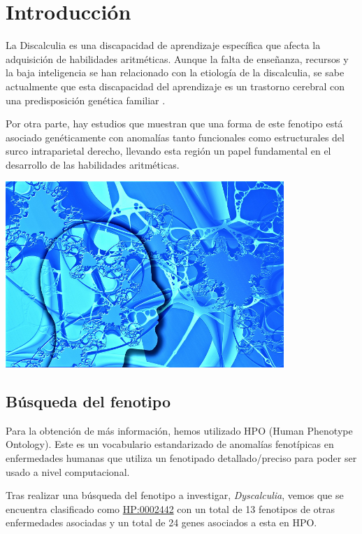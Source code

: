 \section{Introducción}

La Discalculia es una discapacidad de aprendizaje específica que afecta la adquisición de habilidades aritméticas. Aunque la falta de  enseñanza, recursos y la baja inteligencia se han relacionado con la etiología de la discalculia, se sabe actualmente que esta discapacidad del aprendizaje es un trastorno cerebral con una predisposición genética familiar \cite{Molko2003}.

\hfill

Por otra parte, hay estudios \cite{Molko2003,Shalev2001} que muestran que una forma de este fenotipo está asociado genéticamente con anomalías tanto funcionales como estructurales del surco intraparietal derecho, llevando esta región un papel fundamental en el desarrollo de las habilidades aritméticas.

\hfill

\begin{center}
\includegraphics[width=0.79\textwidth]{figures/Neurons.png}
\end{center}

\subsection{Búsqueda del fenotipo}

Para la obtención de más información, hemos utilizado HPO (Human Phenotype Ontology). Este es un vocabulario estandarizado de anomalías fenotípicas en enfermedades humanas que utiliza un fenotipado detallado/preciso para poder ser usado a nivel computacional.

\hfill

Tras realizar una búsqueda del fenotipo a investigar, \textit{Dyscalculia}, vemos que se encuentra clasificado como \href{https://hpo.jax.org/app/browse/term/HP:0002442}{HP:0002442} con un total de 13 fenotipos de otras enfermedades asociadas y un total de 24 genes asociados a esta en HPO.

